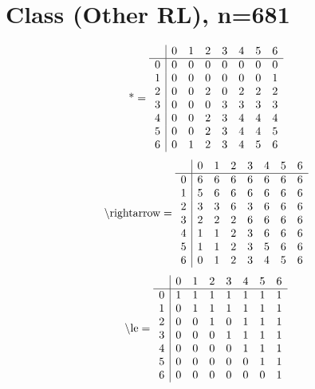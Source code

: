 \documentclass[11pt]{article}
\begin{document}
\section{Class (Other RL), n=681}
\[\text{*} = 
\begin{array}{r | r r r r r r r}
 & 0 & 1 & 2 & 3 & 4 & 5 & 6 \\ \hline
0 & 0 & 0 & 0 & 0 & 0 & 0 & 0 \\
1 & 0 & 0 & 0 & 0 & 0 & 0 & 1 \\
2 & 0 & 0 & 2 & 0 & 2 & 2 & 2 \\
3 & 0 & 0 & 0 & 3 & 3 & 3 & 3 \\
4 & 0 & 0 & 2 & 3 & 4 & 4 & 4 \\
5 & 0 & 0 & 2 & 3 & 4 & 4 & 5 \\
6 & 0 & 1 & 2 & 3 & 4 & 5 & 6 \\
\end{array}
\]
\[\text{\textbackslash rightarrow} = 
\begin{array}{r | r r r r r r r}
 & 0 & 1 & 2 & 3 & 4 & 5 & 6 \\ \hline
0 & 6 & 6 & 6 & 6 & 6 & 6 & 6 \\
1 & 5 & 6 & 6 & 6 & 6 & 6 & 6 \\
2 & 3 & 3 & 6 & 3 & 6 & 6 & 6 \\
3 & 2 & 2 & 2 & 6 & 6 & 6 & 6 \\
4 & 1 & 1 & 2 & 3 & 6 & 6 & 6 \\
5 & 1 & 1 & 2 & 3 & 5 & 6 & 6 \\
6 & 0 & 1 & 2 & 3 & 4 & 5 & 6 \\
\end{array}
\]
\[\text{\textbackslash le} = 
\begin{array}{r | r r r r r r r}
 & 0 & 1 & 2 & 3 & 4 & 5 & 6 \\ \hline
0 & 1 & 1 & 1 & 1 & 1 & 1 & 1 \\
1 & 0 & 1 & 1 & 1 & 1 & 1 & 1 \\
2 & 0 & 0 & 1 & 0 & 1 & 1 & 1 \\
3 & 0 & 0 & 0 & 1 & 1 & 1 & 1 \\
4 & 0 & 0 & 0 & 0 & 1 & 1 & 1 \\
5 & 0 & 0 & 0 & 0 & 0 & 1 & 1 \\
6 & 0 & 0 & 0 & 0 & 0 & 0 & 1 \\
\end{array}
\]
\end{document}
